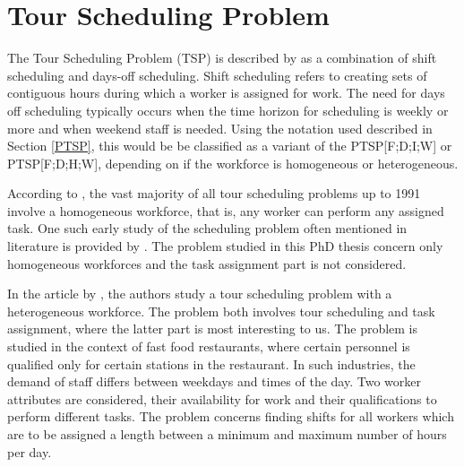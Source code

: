 
 

%
%
%
%


\section{Tour Scheduling Problem}\label{TSP}

The Tour Scheduling Problem (TSP) is described by \citet{loucks_1991} as a combination of shift scheduling and days-off scheduling. Shift scheduling refers to creating sets of contiguous hours during which a worker is assigned for work. The need for days off scheduling typically occurs when the time horizon for scheduling is weekly or more and when weekend staff is needed. Using the notation used described in Section \ref{PTSP}, this would be be classified as a variant of the PTSP[F;D;I;W] or PTSP[F;D;H;W], depending on if the workforce is homogeneous or heterogeneous.

According to \citet{loucks_1991}, the vast majority of all tour scheduling problems up to 1991 involve a homogeneous workforce, that is, any worker can perform any assigned task. One such early study of the scheduling problem often mentioned in literature is provided by \citet{thompson_1988}. The problem studied in this PhD thesis concern only homogeneous workforces and the task assignment part is not considered.

In the article by \citet{loucks_1991}, the authors study a tour scheduling problem with a heterogeneous workforce. The problem both involves tour scheduling and task assignment, where the latter part is most interesting to us. The problem is studied in the context of fast food restaurants, where certain personnel is qualified only for certain stations in the restaurant. In such industries, the demand of staff differs between weekdays and times of the day. Two worker attributes are considered, their availability for work and their qualifications to perform different tasks. The problem concerns finding shifts for all workers which are to be assigned a length between a minimum and maximum number of hours per day.

